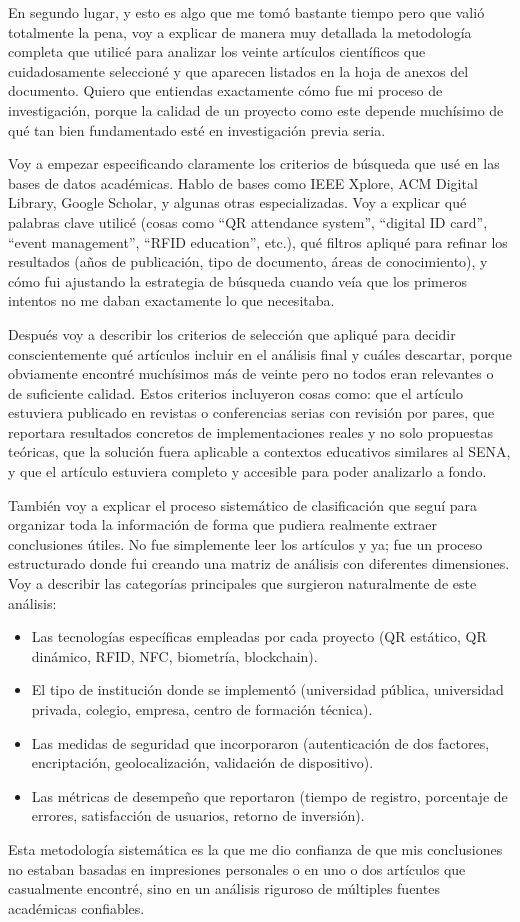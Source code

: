 En segundo lugar, y esto es algo que me tomó bastante tiempo pero que valió totalmente la pena, voy a explicar de manera muy detallada la metodología completa que utilicé para analizar los veinte artículos científicos que cuidadosamente seleccioné y que aparecen listados en la hoja de anexos del documento. Quiero que entiendas exactamente cómo fue mi proceso de investigación, porque la calidad de un proyecto como este depende muchísimo de qué tan bien fundamentado esté en investigación previa seria.

Voy a empezar especificando claramente los criterios de búsqueda que usé en las bases de datos académicas. Hablo de bases como IEEE Xplore, ACM Digital Library, Google Scholar, y algunas otras especializadas. Voy a explicar qué palabras clave utilicé (cosas como ``QR attendance system'', ``digital ID card'', ``event management'', ``RFID education'', etc.), qué filtros apliqué para refinar los resultados (años de publicación, tipo de documento, áreas de conocimiento), y cómo fui ajustando la estrategia de búsqueda cuando veía que los primeros intentos no me daban exactamente lo que necesitaba.

Después voy a describir los criterios de selección que apliqué para decidir conscientemente qué artículos incluir en el análisis final y cuáles descartar, porque obviamente encontré muchísimos más de veinte pero no todos eran relevantes o de suficiente calidad. Estos criterios incluyeron cosas como: que el artículo estuviera publicado en revistas o conferencias serias con revisión por pares, que reportara resultados concretos de implementaciones reales y no solo propuestas teóricas, que la solución fuera aplicable a contextos educativos similares al SENA, y que el artículo estuviera completo y accesible para poder analizarlo a fondo.

También voy a explicar el proceso sistemático de clasificación que seguí para organizar toda la información de forma que pudiera realmente extraer conclusiones útiles. No fue simplemente leer los artículos y ya; fue un proceso estructurado donde fui creando una matriz de análisis con diferentes dimensiones. Voy a describir las categorías principales que surgieron naturalmente de este análisis:
\begin{itemize}
    \item Las tecnologías específicas empleadas por cada proyecto (QR estático, QR dinámico, RFID, NFC, biometría, blockchain).
    \item El tipo de institución donde se implementó (universidad pública, universidad privada, colegio, empresa, centro de formación técnica).
    \item Las medidas de seguridad que incorporaron (autenticación de dos factores, encriptación, geolocalización, validación de dispositivo).
    \item Las métricas de desempeño que reportaron (tiempo de registro, porcentaje de errores, satisfacción de usuarios, retorno de inversión).
\end{itemize}
Esta metodología sistemática es la que me dio confianza de que mis conclusiones no estaban basadas en impresiones personales o en uno o dos artículos que casualmente encontré, sino en un análisis riguroso de múltiples fuentes académicas confiables.

